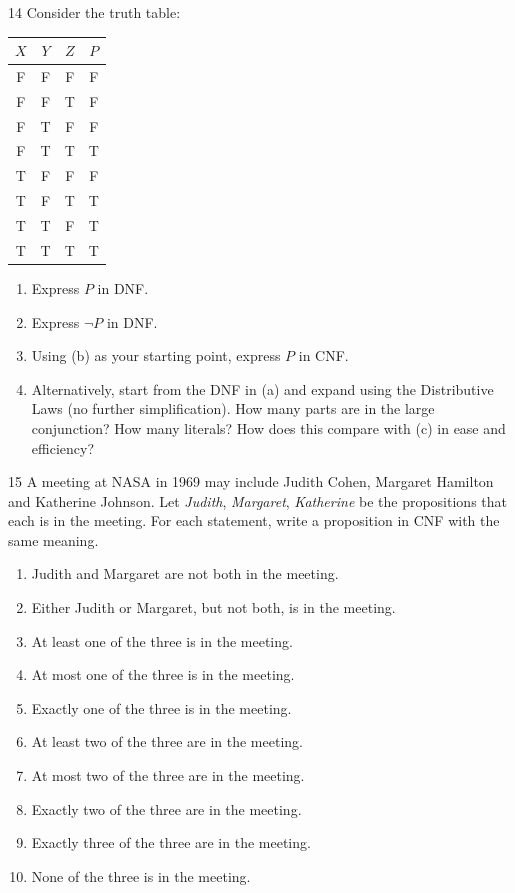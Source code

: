 \begin{exercise}{14}
    Consider the truth table:
    \begin{center}
    \begin{tabular}{ccc|c}
        $X$ & $Y$ & $Z$ & $P$\\\hline
        F&F&F&F\\ F&F&T&F\\ F&T&F&F\\ F&T&T&T\\
        T&F&F&F\\ T&F&T&T\\ T&T&F&T\\ T&T&T&T
    \end{tabular}
    \end{center}
    \begin{enumerate}[label=(\alph*)]
        \item Express $P$ in DNF.
        \item Express $\neg P$ in DNF.
        \item Using (b) as your starting point, express $P$ in CNF.
        \item Alternatively, start from the DNF in (a) and expand using the
              Distributive Laws (no further simplification). How many parts are
              in the large conjunction? How many literals? How does this compare
              with (c) in ease and efficiency?
    \end{enumerate}
\end{exercise}

\begin{exercise}{15}
    A meeting at NASA in 1969 may include Judith Cohen, Margaret Hamilton and
    Katherine Johnson. Let \textit{Judith}, \textit{Margaret}, \textit{Katherine}
    be the propositions that each is in the meeting. For each statement, write a
    proposition in CNF with the same meaning.
    \begin{enumerate}[label=(\alph*)]
        \item Judith and Margaret are not both in the meeting.
        \item Either Judith or Margaret, but not both, is in the meeting.
        \item At least one of the three is in the meeting.
        \item At most one of the three is in the meeting.
        \item Exactly one of the three is in the meeting.
        \item At least two of the three are in the meeting.
        \item At most two of the three are in the meeting.
        \item Exactly two of the three are in the meeting.
        \item Exactly three of the three are in the meeting.
        \item None of the three is in the meeting.
    \end{enumerate}
\end{exercise}

